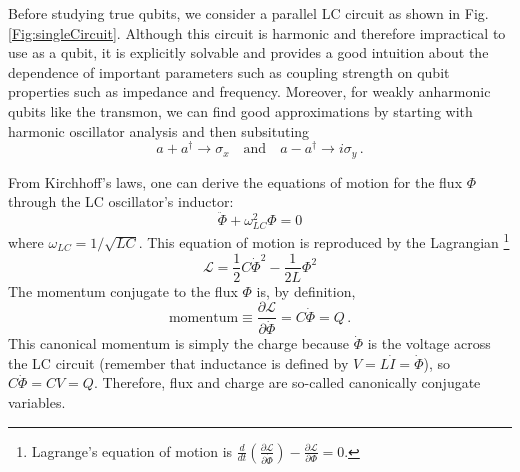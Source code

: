 
Before studying true qubits, we consider a parallel LC circuit as shown in Fig.\,\ref{Fig:singleCircuit}.
Although this circuit is harmonic and therefore impractical to use as a qubit, it is explicitly solvable and provides a good intuition about the dependence of important parameters such as coupling strength on qubit properties such as impedance and frequency.
Moreover, for weakly anharmonic qubits like the transmon, we can find good approximations by starting with harmonic oscillator analysis and then subsituting
\begin{equation*}
  a + a^\dagger \rightarrow \sigma_x
  \quad \textrm{and} \quad
  a - a^\dagger \rightarrow i \sigma_y \, .
\end{equation*}

From Kirchhoff's laws, one can derive the equations of motion for the flux $\Phi$ through the LC oscillator's inductor:
\begin{equation*}
  \ddot{\Phi} + \omega_{LC}^2 \Phi = 0
\end{equation*}
where $\omega_{LC}=1/\sqrt{LC}$.
This equation of motion is reproduced by the Lagrangian \footnote{Lagrange's equation of motion is $\frac{d}{dt}\left( \frac{\partial \mathcal{L}}{\partial \dot{\Phi}} \right) - \frac{\partial \mathcal{L}}{\partial \Phi} = 0$.}
\begin{equation*}
  \mathcal{L} = \frac{1}{2}C\dot{\Phi}^2 - \frac{1}{2L}\Phi^2
\end{equation*}
The momentum conjugate to the flux $\Phi$ is, by definition,
\begin{equation*}
  \text{momentum} \equiv \frac{\partial \mathcal{L}}{\partial \dot{\Phi}} = C\dot{\Phi} = Q \, .
\end{equation*}
This canonical momentum is simply the charge because $\dot{\Phi}$ is the voltage across the LC circuit (remember that inductance is defined by $V = L \dot{I} = \dot{\Phi}$), so $C \dot{\Phi} = C V = Q$.
Therefore, flux and charge are so-called canonically conjugate variables.

